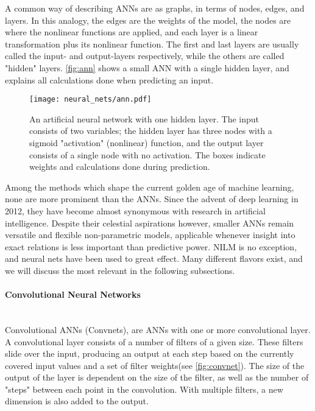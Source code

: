 \documentclass[12pt, american]{article}
\begin{document}
A common way of describing ANNs are as graphs, in terms of nodes, edges, and layers. In this analogy, the edges are the weights of the model, the nodes are where the nonlinear functions are applied, and each layer is a linear transformation plus its nonlinear function. The first and last layers are usually called the input- and output-layers respectively, while the others are called "hidden" layers. \autoref{fig:ann} shows a small ANN with a single hidden layer, and explains all calculations done when predicting an input.

\begin{figure}[h]
\centering
\caption{An artificial neural network with one hidden layer. The input consists of two variables; the hidden layer has three nodes with a sigmoid "activation" (nonlinear) function, and the output layer consists of a single node with no activation. The boxes indicate weights and calculations done during prediction.}
\texttt{[image: neural\_nets/ann.pdf]}
\label{fig:ann}
\end{figure}


Among the methods which shape the current golden age of machine learning, none are more prominent than the ANNs. Since the advent of deep learning in 2012\cite{Krizhevsky2012}, they have become almost synonymous with research in artificial intelligence. Despite their celestial aspirations however, smaller ANNs remain versatile and flexible  non-parametric models, applicable whenever insight into exact relations is less important than predictive power. NILM is no exception, and neural nets have been used to great effect\cite{Kelly2015c,RevueltaHerrero2018}. Many different flavors exist, and we will discuss the most relevant in the following subsections.

\paragraph{Convolutional Neural Networks}\mbox{}\\

\noindent Convolutional ANNs (Convnets), are ANNs with one or more convolutional layer. A convolutional layer consists of a number of filters of a given size. These filters slide over the input, producing an output at each step based on the currently covered input values and a set of filter weights(see \autoref{fig:convnet}). The size of the output of the layer is dependent on the size of the filter, as well as the number of "steps" between each point in the convolution. With multiple filters, a new dimension is also added to the output.
\end{document}
